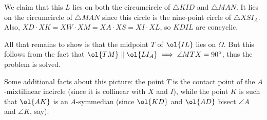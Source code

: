 \documentclass[11pt]{scrartcl}
\begin{document}
We claim that this $L$ lies on
both the circumcircle of $\triangle KID$ and $\triangle MAN$.
It lies on the circumcircle of $\triangle MAN$
since this circle is the nine-point circle of $\triangle XSI_A$.
Also, $XD \cdot XK = XW \cdot XM = XA \cdot XS = XI \cdot XL$,
so $KDIL$ are concyclic.

All that remains to show is that the
midpoint $T$ of $\ol{IL}$ lies on $\Omega$.
But this follows from the fact that
$\ol{TM} \parallel \ol{LI_A} \implies \angle MTX = 90^{\circ}$,
thus the problem is solved.

\begin{remark*}
  Some additional facts about this picture:
  the point $T$ is the contact point of the $A$-mixtilinear incircle
  (since it is collinear with $X$ and $I$),
  while the point $K$ is such that $\ol{AK}$ is an $A$-symmedian
  (since $\ol{KD}$ and $\ol{AD}$ bisect $\angle A$ and $\angle K$, say).
\end{remark*}
\end{document}
